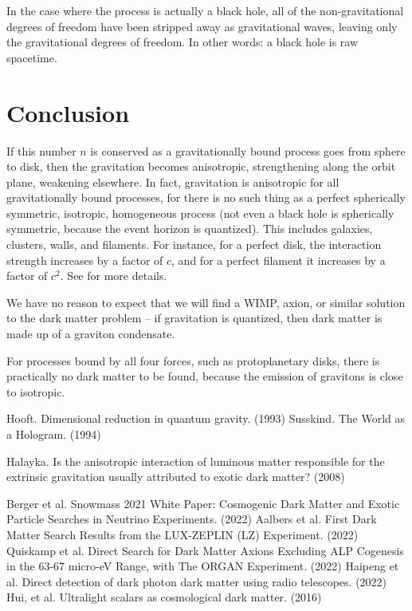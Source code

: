 \documentclass[12pt]{article}
\begin{document}
In the case where the process is actually a black hole, all of the non-gravitational degrees of freedom have been stripped away as gravitational waves, leaving only the gravitational degrees of freedom.
In other words: a black hole is raw spacetime.


\section{Conclusion}

If this number $n$ is conserved as a gravitationally bound process goes from sphere to disk, then the gravitation becomes anisotropic, strengthening along the orbit plane, weakening elsewhere.
In fact, gravitation is anisotropic for all gravitationally bound processes, for there is no such thing as a perfect spherically symmetric, isotropic, homogeneous process (not even a black hole is spherically symmetric, because the event horizon is quantized).
This includes galaxies, clusters, walls, and filaments.
For instance, for a perfect disk, the interaction strength increases by a factor of $c$, and for a perfect filament it increases by a factor of $c^2$.
See \cite{halayka} for more details.

We have no reason to expect that we will find a WIMP, axion, or similar solution \cite{berger, aalbers, quiskamp, haipeng, hui} to the dark matter problem -- if gravitation is quantized, then dark matter is made up of a graviton condensate.

For processes bound by all four forces, such as protoplanetary disks, there is practically no dark matter to be found, because the emission of gravitons is close to isotropic.




\begin{thebibliography}{9}
 Hooft. Dimensional reduction in quantum gravity. (1993)
 Susskind. The World as a Hologram. (1994)

 Halayka. Is the anisotropic interaction of luminous matter responsible for the extrinsic gravitation usually attributed to exotic dark matter? (2008)

 Berger et al. Snowmass 2021 White Paper: Cosmogenic Dark Matter and Exotic Particle Searches in Neutrino Experiments. (2022)
 Aalbers et al. First Dark Matter Search Results from the LUX-ZEPLIN (LZ) Experiment. (2022)
 Quiskamp et al. Direct Search for Dark Matter Axions Excluding ALP Cogenesis in the 63-67 micro-eV Range, with The ORGAN Experiment. (2022)
 Haipeng et al. Direct detection of dark photon dark matter using radio telescopes. (2022)
 Hui, et al. Ultralight scalars as cosmological dark matter. (2016)


\end{thebibliography}
\end{document}

